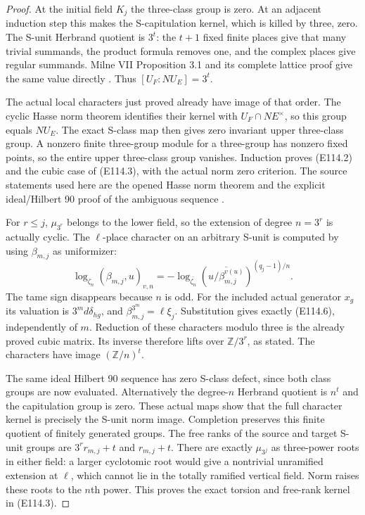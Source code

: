 \begin{proof}
At the initial field $K_j$ the three-class group is
zero. At an adjacent induction step this makes the
S-capitulation kernel, which is killed by three,
zero. The S-unit Herbrand quotient is $3^t$:
the $t+1$ fixed finite places give that many trivial
summands, the product formula removes one, and the
complex places give regular summands. Milne VII
Proposition 3.1 and its complete lattice proof give
the same value directly \cite{E_MilneCFT}.
Thus $[U_F:NU_E]=3^t$.

The actual local characters just proved already have
image of that order. The cyclic Hasse norm theorem
identifies their kernel with $U_F\cap NE^\times$,
so this group equals $NU_E$. The exact S-class map
then gives zero invariant upper three-class group.
A nonzero finite three-group module for a three-group
has nonzero fixed points, so the entire upper
three-class group vanishes. Induction proves (E114.2)
and the cubic case of (E114.3), with the actual norm
zero criterion. The source statements used here are
the opened Hasse norm theorem and the explicit
ideal/Hilbert 90 proof of the ambiguous sequence
\cite[VIII, Theorem 3.1]{E_MilneCFT}
\cite[Theorem 1 and Proposition 1]{E_LemmermeyerAmbiguous}.

For $r\le j$, $\mu_{3^r}$ belongs to the lower field,
so the extension of degree $n=3^r$ is actually cyclic.
The $\ell$-place character on an arbitrary S-unit is
computed by using $\beta_{m,j}$ as uniformizer:
\[
 \log_{\zeta_n}(\beta_{m,j},u)_{v,n}
       =-\log_{\overline{\zeta_n}}
          \left(\overline{u/\beta_{m,j}^{v(u)}}
                                             \right)^{(q_j-1)/n}.
 \tag{E114.15}
\]
The tame sign disappears because $n$ is odd.
For the included actual generator $x_g$ its valuation
is $3^m d\delta_{hg}$, and
$\beta_{m,j}^{3^m}=\ell\xi_j$.
Substitution gives exactly (E114.6), independently
of $m$. Reduction of these characters modulo three
is the already proved cubic matrix. Its inverse
therefore lifts over $\mathbb Z/3^r$, as stated.
The characters have image $(\mathbb Z/n)^t$.

The same ideal Hilbert 90 sequence has zero S-class
defect, since both class groups are now evaluated.
Alternatively the degree-$n$ Herbrand quotient is
$n^t$ and the capitulation group is zero. These actual
maps show that the full character kernel is precisely
the S-unit norm image. Completion preserves this
finite quotient of finitely generated groups.
The free ranks of the source and target S-unit groups
are $3^r r_{m,j}+t$ and $r_{m,j}+t$.
There are exactly $\mu_{3^j}$ as three-power roots
in either field: a larger cyclotomic root would give
a nontrivial unramified extension at $\ell$, which
cannot lie in the totally ramified vertical field.
Norm raises these roots to the $n$th power. This proves
the exact torsion and free-rank kernel in (E114.3).


\end{proof}
